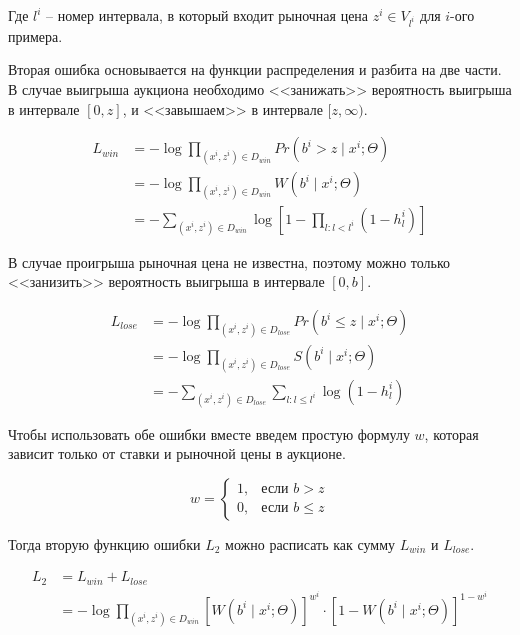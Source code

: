 \documentclass[times,specification,annotation]{itmo-student-thesis}
\begin{document}
Где $l^i$ – номер интервала, в который входит рыночная цена $z^i \in V_{l^i}$ для $i$-ого примера.

Вторая ошибка основывается на функции распределения и разбита на две части. 
В случае выигрыша аукциона необходимо <<занижать>> вероятность выигрыша в интервале $[0, z]$, и <<завышаем>> в интервале $[z, \infty)$.

\begin{equation}
    \begin{split}
        L_{win} & = - \log \prod_{(x^i, z^i) \in D_{win}} Pr(b^i > z \mid x^i; \Theta) \\
        & = - \log \prod_{(x^i, z^i) \in D_{win}} W(b^i \mid x^i; \Theta) \\
        & = - \sum_{(x^i, z^i) \in D_{win}} \log \left[1 - \prod_{l: l < l^i} (1 - h_l^i)\right]
    \end{split}
\end{equation}

В случае проигрыша рыночная цена не известна, поэтому можно только <<занизить>> вероятность выигрыша в интервале $[0, b]$.

\begin{equation}
    \begin{split}
        L_{lose} & = - \log \prod_{(x^i, z^i) \in D_{lose}} Pr(b^i \leq z \mid x^i; \Theta) \\
        & = - \log \prod_{(x^i, z^i) \in D_{lose}} S(b^i \mid x^i; \Theta) \\
        & = - \sum_{(x^i, z^i) \in D_{lose}} \sum_{l: l \leq l^i} \log (1 - h_l^i)
    \end{split}
\end{equation}

Чтобы использовать обе ошибки вместе введем простую формулу $w$, которая зависит только от ставки и рыночной цены в аукционе.

\begin{equation}
    w = \begin{cases}
        1, & \mbox{если } b > z \\ 0, & \mbox{если } b \leq z
    \end{cases}
\end{equation}

Тогда вторую функцию ошибки $L_2$ можно расписать как сумму $L_{win}$ и $L_{lose}$.

\begin{equation}
    \begin{split}
        L_2 & = L_{win} + L_{lose} \\
        & = - \log \prod_{(x^i, z^i) \in D_{win}} {[W(b^i \mid x^i; \Theta)]}^{w^i} \cdot {\left[1 - W(b^i \mid x^i; \Theta)\right]}^{1 - w^i}
    \end{split}
\end{equation}
\end{document}
